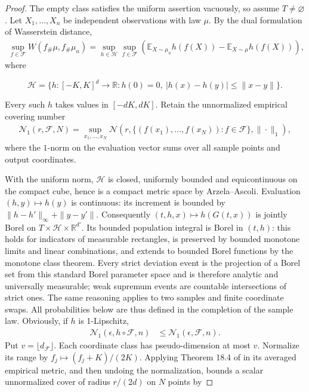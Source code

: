 \begin{proof}
The empty class satisfies the uniform assertion vacuously, so assume $T\ne\varnothing$. Let $X_1,\ldots,X_n$ be independent observations with law $\mu$. By the dual formulation of Wasserstein distance,
\begin{align*}
\sup_{f\in\mathcal F}W(f_{\#}\mu,f_{\#}\mu_n)
=\sup_{h\in\mathcal H}\sup_{f\in\mathcal F}\left(\mathbb E_{X\sim\mu_n}h(f(X))-\mathbb E_{X\sim\mu}h(f(X))\right),
\end{align*}
where

\[
\mathcal H=\{h:[-K,K]^d\rightarrow\mathbb R:h(0)=0,\ |h(x)-h(y)|\leqslant\|x-y\|\}.
\]

Every such $h$ takes values in $[-dK,dK]$. Retain the unnormalized empirical covering number
\begin{align*}
\mathcal N_1(r,\mathcal F,N)=\sup_{x_1,\ldots,x_N}\mathcal N\left(r,\{(f(x_1),\ldots,f(x_N)):f\in\mathcal F\},\|\cdotp\|_1\right),
\end{align*}
where the $1$-norm on the evaluation vector sums over all sample points and output coordinates. 

With the uniform norm, $\mathcal H$ is closed, uniformly bounded and equicontinuous on the compact cube, hence is a compact metric space by Arzela--Ascoli. Evaluation $(h,y)\mapsto h(y)$ is continuous: its increment is bounded by $\|h-h'\|_\infty+\|y-y'\|$. Consequently $(t,h,x)\mapsto h(G(t,x))$ is jointly Borel on $T\times\mathcal H\times\mathbb R^{d'}$. Its bounded population integral is Borel in $(t,h)$: this holds for indicators of measurable rectangles, is preserved by bounded monotone limits and linear combinations, and extends to bounded Borel functions by the monotone class theorem. Every strict deviation event is the projection of a Borel set from this standard Borel parameter space and is therefore analytic and universally measurable; weak supremum events are countable intersections of strict ones. The same reasoning applies to two samples and finite coordinate swaps. All probabilities below are thus defined in the completion of the sample law. Obviously, if $ h$ is 1-Lipschitz, 
\begin{align*}
\mathcal{N}_{1}( \epsilon ,h\circ \mathcal{F} ,n) & \leqslant \mathcal{N}_{1}( \epsilon ,\mathcal{F} ,n) .
\end{align*}
Put $v=\lfloor d_{\mathcal F}\rfloor$. Each coordinate class has pseudo-dimension at most $v$. Normalize its range by $f_j\mapsto(f_j+K)/(2K)$. Applying Theorem 18.4 of \cite{anthony1999neural} in its averaged empirical metric, and then undoing the normalization, bounds a scalar unnormalized cover of radius $r/(2d)$ on $N$ points by


\end{proof}
